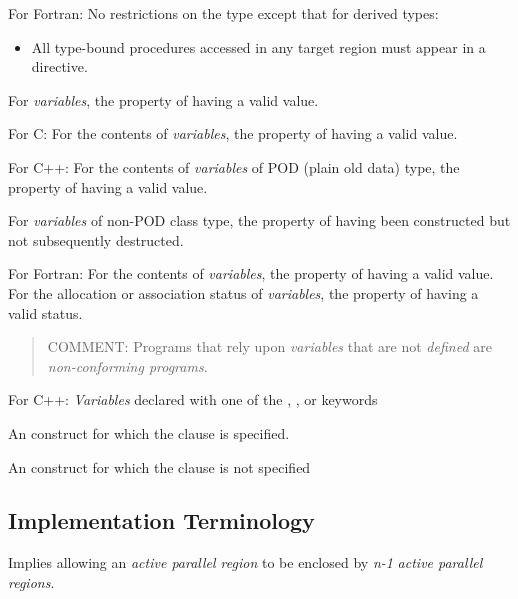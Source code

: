 For Fortran: 
\nopagebreak
No restrictions on the type except that for derived types:

\begin{itemize}
\item All type-bound procedures accessed in any target region must appear in a ~ directive.
\end{itemize}
\glossarydefend

\glossarydefstart
For \emph{variables}, the property of having a valid value.

For C:
\nopagebreak
For the contents of \emph{variables}, the property of having a valid value.

For C++: 
\nopagebreak
For the contents of \emph{variables} of POD (plain old data) type, the property of having 
a valid value.

For \emph{variables} of non-POD class type, the property of having been constructed but 
not subsequently destructed.

For Fortran: 
\nopagebreak
For the contents of \emph{variables}, the property of having a valid value. For the 
allocation or association status of \emph{variables}, the property of having a valid status.

\begin{quote}
COMMENT: Programs that rely upon \emph{variables} that are not \emph{defined} are \emph{non-conforming programs}.
\end{quote}
\glossarydefend

\glossarydefstart
For C++: \emph{Variables} declared with one of the , , or  keywords
\glossarydefend

\glossarydefstart
An  construct for which the  clause is specified.
\glossarydefend
\bigskip

\glossarydefstart
An  construct for which the  clause is not specified
\glossarydefend
\bigskip
\bigskip
\bigskip





\subsection{Implementation Terminology}
\label{subsec:Implementation Terminology}
\glossarydefstart
Implies allowing an \emph{active parallel region} to be enclosed by \emph{n-1} \emph{active parallel 
regions}.
\glossarydefend

